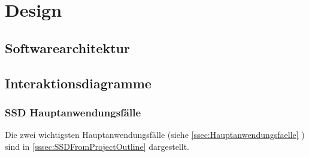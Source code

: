 \documentclass[11pt,ngerman]{article}
\begin{document}


    \section{Design}

    \subsection{Softwarearchitektur}

    \subsection{Interaktionsdiagramme}

    \subsubsection{SSD Hauptanwendungsfälle}
    Die zwei wichtigsten Hauptanwendungsfälle (siehe \ref{ssec:Hauptanwendungsfaelle}  ) sind in \ref{sssec:SSDFromProjectOutline}  dargestellt.
\end{document}
